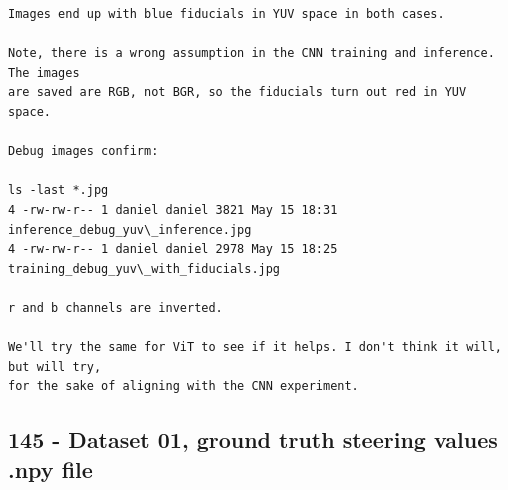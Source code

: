 \begin{verbatim}
Images end up with blue fiducials in YUV space in both cases.  

Note, there is a wrong assumption in the CNN training and inference. The images
are saved are RGB, not BGR, so the fiducials turn out red in YUV space.

Debug images confirm:

ls -last *.jpg
4 -rw-rw-r-- 1 daniel daniel 3821 May 15 18:31 inference_debug_yuv\_inference.jpg
4 -rw-rw-r-- 1 daniel daniel 2978 May 15 18:25 training_debug_yuv\_with_fiducials.jpg

r and b channels are inverted.

We'll try the same for ViT to see if it helps. I don't think it will, but will try,
for the sake of aligning with the CNN experiment.

\end{verbatim}


\subsection{145 - Dataset 01, ground truth steering values .npy file}
\label{app_res:145}

